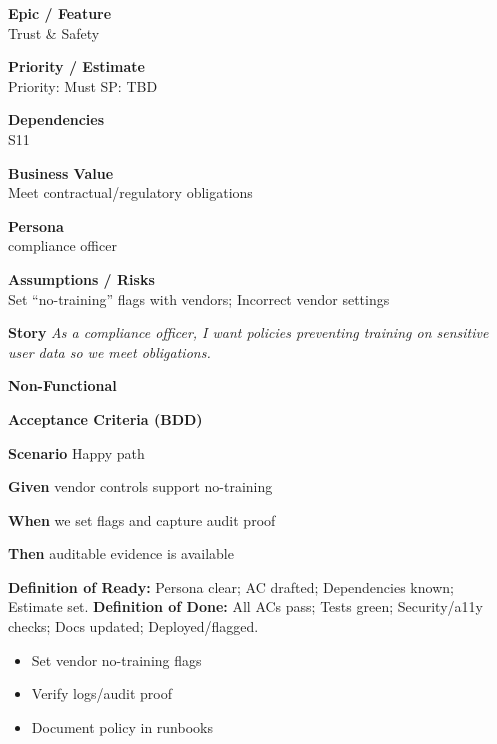 \documentclass[11pt,a4paper]{article}
\newenvironment{StoryCard}[2][]{
  \begin{tcolorbox}[enhanced, breakable, sharp corners=all, colback=cardback, colframe=cardframe,
    title={#2}, fonttitle=\bfseries\large, boxrule=0.6pt, borderline west={2pt}{0pt}{accent}, #1]
}{
  \end{tcolorbox}
}
\newcommand{\badge}[1]{\pill{\footnotesize #1}}
\newcommand{\cb}{\(\square\)}
\newenvironment{TasksBox}[1][Tasks]{%
  \begin{tcolorbox}[enhanced,breakable,
    colback=cardback, colframe=cardframe, title={#1},
    borderline west={1.8pt}{0pt}{MidnightBlue},
    arc=2pt, boxrule=0.4pt,
    left=10pt,right=10pt,top=6pt,bottom=6pt,
    before skip=6pt, after skip=10pt
  ]
  \small
  \begin{itemize}[label=\cb, leftmargin=*, labelsep=0.6em, itemsep=4pt, topsep=2pt, parsep=0pt]
}{%
  \end{itemize}
  \end{tcolorbox}
}
\begin{document}
\begin{StoryCard}{S13 — Data leakage prevention}
\noindent\begin{minipage}[t]{0.49\textwidth}
\textbf{Epic / Feature}\\
Trust \& Safety

\medskip
\textbf{Priority / Estimate}\\
Priority: Must \quad SP: TBD

\medskip
\textbf{Dependencies}\\
S11
\end{minipage}\hfill
\begin{minipage}[t]{0.49\textwidth}
\textbf{Business Value}\\
Meet contractual/regulatory obligations

\medskip
\textbf{Persona}\\
compliance officer

\medskip
\textbf{Assumptions / Risks}\\
Set ``no-training'' flags with vendors; Incorrect vendor settings
\end{minipage}

\medskip
\textbf{Story} \emph{As a compliance officer, I want policies preventing training on sensitive user data so we meet obligations.}

\medskip
\textbf{Non-Functional}
\badge{Security}\ \badge{Privacy}

\medskip
\textbf{Acceptance Criteria (BDD)}\par
\textbf{Scenario} Happy path\par
\textbf{Given} vendor controls support no-training\par
\textbf{When} we set flags and capture audit proof\par
\textbf{Then} auditable evidence is available\par
\medskip
\footnotesize \textbf{Definition of Ready:} Persona clear; AC drafted; Dependencies known; Estimate set.\quad
\textbf{Definition of Done:} All ACs pass; Tests green; Security/a11y checks; Docs updated; Deployed/flagged.
\end{StoryCard}

\begin{TasksBox}[Tasks]
  \item Set vendor no-training flags
  \item Verify logs/audit proof
  \item Document policy in runbooks
\end{TasksBox}
\clearpage
\end{document}
